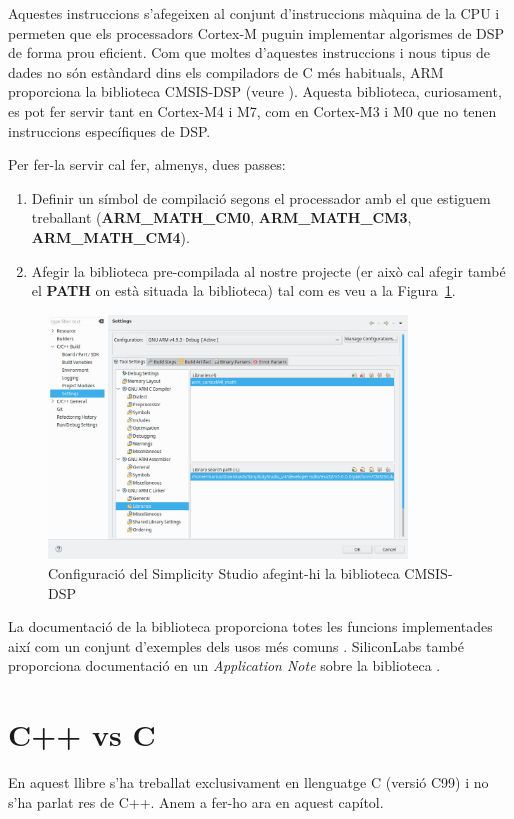 Aquestes instruccions s'afegeixen al conjunt d'instruccions màquina de la CPU i permeten que els processadors Cortex-M puguin implementar algorismes de DSP de forma prou eficient. Com que moltes d'aquestes instruccions i nous tipus de dades no són estàndard dins els compiladors de C més habituals, \gls{ARM} proporciona la biblioteca CMSIS-DSP (veure ). Aquesta biblioteca, curiosament, es pot fer servir tant en Cortex-M4 i M7, com en Cortex-M3 i M0 que no tenen instruccions específiques de DSP.

Per fer-la servir cal fer, almenys, dues passes:
\begin{enumerate}
 \item Definir un símbol de compilació segons el processador amb el que estiguem treballant ({\bf ARM\_MATH\_CM0}, {\bf ARM\_MATH\_CM3}, {\bf ARM\_MATH\_CM4}).
 \item Afegir la biblioteca pre-compilada al nostre projecte (er això cal afegir també el {\bf PATH} on està situada la biblioteca) tal com es veu a la Figura~\ref{fig:EnableDSP}.
\end{enumerate}

\begin{figure}
 \centering
 \includegraphics[width=0.85\textwidth, keepaspectratio]{imatges/EnablingDSP_Lib.png}
 \caption{Configuració del Simplicity Studio afegint-hi la biblioteca CMSIS-DSP}
 \label{fig:EnableDSP}
\end{figure}

La documentació de la biblioteca proporciona totes les funcions implementades així com un conjunt d'exemples dels usos més comuns \cite{CORE-DSP}. SiliconLabs també proporciona documentació en un {\em Application Note} sobre la biblioteca \cite{AN0051}.

\chapter{C++ vs C}
\label{ch:CvsCPP}
En aquest llibre s'ha treballat exclusivament en llenguatge C (versió C99) i no s'ha parlat res de C++. Anem a fer-ho ara en aquest capítol.

